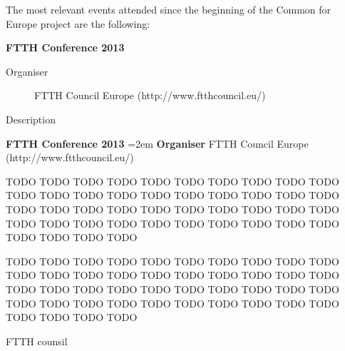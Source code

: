 The most relevant events attended since the beginning of the Common for Europe project are the following:

\textbf{FTTH Conference 2013}
\begin{description}
 \item[Organiser] FTTH Council Europe (http://www.ftthcouncil.eu/)
 \item[Description] 
\end{description}

\textbf{FTTH Conference 2013}
\hangindent=2em
\textbf{Organiser}
FTTH Council Europe (http://www.ftthcouncil.eu/)

TODO TODO TODO TODO TODO TODO TODO TODO TODO TODO TODO TODO TODO TODO TODO TODO TODO TODO TODO TODO TODO TODO TODO TODO TODO TODO TODO TODO TODO TODO TODO TODO TODO TODO TODO TODO TODO TODO TODO TODO TODO TODO TODO TODO 

TODO TODO TODO TODO TODO TODO TODO TODO TODO TODO TODO TODO TODO TODO TODO TODO TODO TODO TODO TODO TODO TODO TODO TODO TODO TODO TODO TODO TODO TODO TODO TODO TODO TODO TODO TODO TODO TODO TODO TODO TODO TODO TODO TODO 




FTTH counsil
